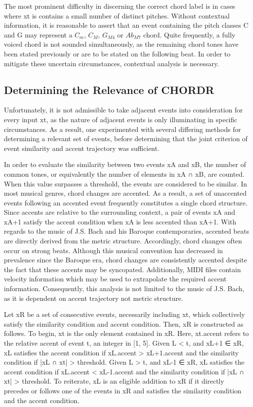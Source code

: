 \documentclass{article} %
\begin{document}
The most prominent difficulty in discerning the correct chord label is in cases where xt is contains a small number of distinct pitches. Without contextual information, it is reasonable to assert that an event containing the pitch classes C and G may represent a $C_{m}$, $C_{M}$, $G_{M4}$ or $Ab_{M7}$ chord. Quite frequently, a fully voiced chord is not sounded simultaneously, as the remaining chord tones have been stated previously or are to be stated on the following beat. In order to mitigate these uncertain circumstances, contextual analysis is necessary.

\subsection{Determining the Relevance of CHORDR}

Unfortunately, it is not admissible to take adjacent events into consideration for every input xt, as the nature of adjacent events is only illuminating in specific circumstances. As a result, one experimented with several differing methods for determining a relevant set of events, before determining that the joint criterion of event similarity and accent trajectory was sufficient.

In order to evaluate the similarity between two events xA and xB, the number of common tones, or equivalently the number of elements in xA ∩ xB, are counted. When this value surpasses a threshold, the events are considered to be similar. In most musical genres, chord changes are accented. As a result, a set of unaccented events following an accented event frequently constitutes a single chord structure. Since accents are relative to the surrounding context, a pair of events xA and xA+1 satisfy the accent condition when xA is less accented than xA+1. With regards to the music of J.S. Bach and his Baroque contemporaries, accented beats are directly derived from the metric structure. Accordingly, chord changes often occur on strong beats. Although this musical convention has decreased in prevalence since the Baroque era, chord changes are consistently accented despite the fact that these accents may be syncopated. Additionally, MIDI files contain velocity information which may be used to extrapolate the required accent information. Consequently, this analysis is not limited to the music of J.S. Bach, as it is dependent on accent trajectory not metric structure.

Let xR be a set of consecutive events, necessarily including xt, which collectively satisfy the similarity condition and accent condition. Then, xR is constructed as follows. To begin, xt is the only element contained in xR. Here, xt.accent refers to the relative accent of event t, an integer in [1, 5]. Given L < t, and xL+1 ∈ xR, xL satisfies the accent condition if xL.accent > xL+1.accent and the similarity condition if |xL ∩ xt| > threshold. Given L > t, and xL-1 ∈ xR, xL satisfies the accent condition if xL.accent < xL-1.accent and the similarity condition if |xL ∩ xt| > threshold. To reiterate, xL is an eligible addition to xR if it directly precedes or follows one of the events in xR and satisfies the similarity condition and the accent condition.
\end{document}
